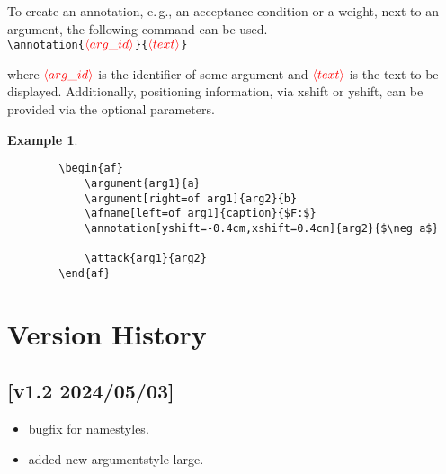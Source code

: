 \documentclass{article}
\newcommand{\opt}[2][red]{\ensuremath{\textcolor{#1}{\langle #2\rangle}}}
\newtheorem{example}{Example}
\begin{document}
    \noindent
    To create an annotation, e.\,g., an acceptance condition or a weight, next to an argument, the following command can be used.\\
    
    \noindent
    \verb|\annotation{|\opt{arg\_id}\verb|}{|\opt{text}\verb|}|

    \begin{list}{}{\leftmargin=\parindent\rightmargin=0pt}
    \item where \opt{arg\_id} is the identifier of some argument and \opt{text} is the text to be displayed.
    Additionally, positioning information, via \textsf{xshift} or \textsf{yshift}, can be provided via the optional parameters.
    \end{list}

    \begin{example}~
    \begin{verbatim}
        \begin{af}
            \argument{arg1}{a}
            \argument[right=of arg1]{arg2}{b}
            \afname[left=of arg1]{caption}{$F:$}
            \annotation[yshift=-0.4cm,xshift=0.4cm]{arg2}{$\neg a$}
    
            \attack{arg1}{arg2}
        \end{af}    
    \end{verbatim}

    \begin{center}
        \begin{af}
    
        \end{af}    
    \end{center}
    \end{example}


\newpage
\section{Version History}

\subsection*{[v1.2 2024/05/03]}
\begin{itemize}
    \item bugfix for namestyles.
    \item added new argumentstyle \textsf{large}.
\end{itemize}
\end{document}
